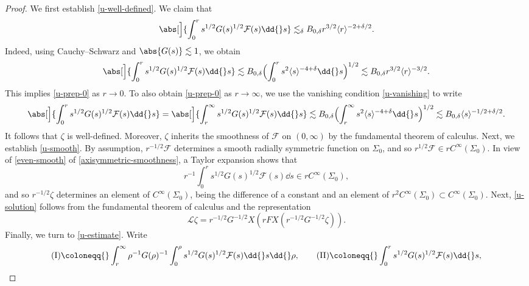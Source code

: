 \documentclass[10pt, reqno]{amsart}
\begin{document}
\begin{proof}
We first establish \cref{u-well-defined}. We claim that
\begin{equation}\label{u-prep-0}
\abs[\Big]{\int_0^r s^{1/2}G(s)^{1/2}\mathcal{F}(s)\dd{}s} \lesssim_\delta{} B_{0,\delta{}}r^{3/2}\langle{}r\rangle^{-2+\delta{}/2}.
\end{equation}
Indeed, using Cauchy--Schwarz and \(\abs{G(s)}\lesssim 1\), we obtain
\begin{equation}
\abs[\Big]{\int_0^r s^{1/2}G(s)^{1/2}\mathcal{F}(s)\dd{}s} \lesssim B_{0,\delta{}}\Bigl(\int_0^r s^2\langle{}s\rangle{}^{-4+\delta{}}\dd{}s\Bigr)^{1/2}\lesssim B_{0,\delta{}}r^{3/2}\langle{}r\rangle^{-3/2}.
\end{equation}
This implies \cref{u-prep-0} as \(r\to 0\). To also obtain \cref{u-prep-0} as \(r\to \infty\),
we use the vanishing condition \cref{u-vanishing} to write
\begin{equation}
\abs[\Big]{\int_0^r s^{1/2}G(s)^{1/2}\mathcal{F}(s)\dd{}s} = \abs[\Big]{\int_r^\infty s^{1/2}G(s)^{1/2}\mathcal{F}(s)\dd{}s}\lesssim B_{0,\delta{}}\Bigl(\int_r^\infty s^2\langle{}s\rangle{}^{-4+\delta{}}\dd{}s\Bigr)^{1/2}\lesssim B_{0,\delta{}}\langle{}s\rangle^{-1/2+\delta{}/2}.
\end{equation}
It follows that \(\zeta{}\) is well-defined. Moreover, \(\zeta{}\) inherits the smoothness
of \(\mathcal{F}\) on \((0,\infty)\) by the fundamental theorem of calculus. Next, we establish \cref{u-smooth}. By assumption, \(r^{-1/2}\mathcal{F}\) determines a smooth radially symmetric function on
\(\Sigma_0\), and so \(r^{1/2}\mathcal{F} \in rC^\infty(\Sigma{}_0)\). In view of
\cref{even-smooth} of \cref{axisymmetric-smoothness}, a Taylor expansion shows that
\begin{equation}
r^{-1}\int_0^r s^{1/2}G(s)^{1/2}\mathcal{F}(s)\dd{}s\in{}rC^\infty(\Sigma{}_0),
\end{equation}
and so \(r^{-1/2}\zeta{}\) determines an element of \(C^\infty(\Sigma{}_0)\), being the difference
of a constant and an element of \(r^2C^\infty(\Sigma_0)\subset C^\infty(\Sigma_0).\) Next, \cref{u-solution} follows from the fundamental theorem of calculus and the
representation
\begin{equation}
\mathcal{L}\zeta{} = r^{-1/2}G^{-1/2}X(rFX(r^{-1/2}G^{-1/2}\zeta{})).
\end{equation}
Finally, we turn to \cref{u-estimate}. Write
\begin{equation}
\textnormal{(I)}\coloneqq{}\int_r^\infty \rho{}^{-1}G(\rho{})^{-1}\int_0^\rho{} s^{1/2}G(s)^{1/2}\mathcal{F}(s)\dd{}s\dd{}\rho{},\qquad \textnormal{(II)} \coloneqq{}\int_0^r s^{1/2}G(s)^{1/2}\mathcal{F}(s)\dd{}s,

\end{equation}
\end{proof}
\end{document}
